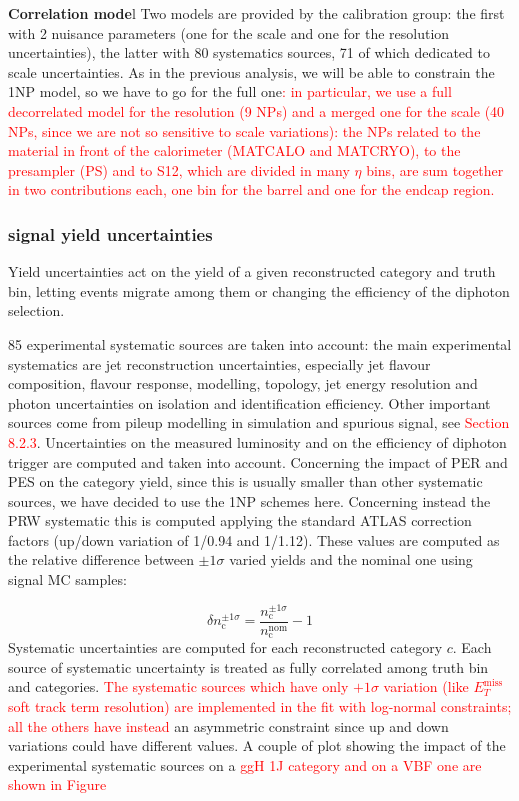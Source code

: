 \textbf{Correlation mode}l Two models are provided by the calibration group: the first with 2 nuisance parameters (one for the scale and one for the resolution uncertainties), the latter with 80 systematics sources, 71 of which dedicated to scale uncertainties. As in the previous analysis, we will be able to constrain the 1NP model, so we have to go for the full one\textcolor{red}{: in particular, we use a full decorrelated model for the resolution (9 NPs) and a merged one for the scale (40 NPs, since we are not so sensitive to scale variations): the NPs related to the material in front of the calorimeter (MATCALO and MATCRYO), to the presampler (PS) and to S12, which are divided in many $\eta$ bins, are sum together in two contributions each, one bin for the barrel and one for the endcap region.}

\subsubsection{signal yield uncertainties}
\label{sssec:yielduncer}

Yield uncertainties act on the yield of a given reconstructed category and truth bin, letting events migrate among them or changing the efficiency of the diphoton selection.

85 experimental systematic sources are taken into account: the main experimental systematics are jet reconstruction uncertainties, especially jet flavour composition, flavour response, modelling, topology, jet energy resolution and photon uncertainties on isolation and identification efficiency. Other important sources come from pileup modelling in simulation and spurious signal, see \textcolor{red}{Section 8.2.3}. Uncertainties on the measured luminosity and on the efficiency of diphoton trigger are computed and taken into account. Concerning the impact of PER and PES on the category yield, since this is usually smaller than other systematic sources, we have decided to use the 1NP schemes here. Concerning instead the PRW systematic this is computed applying the standard ATLAS correction factors (up/down variation of 1/0.94 and 1/1.12). These values are computed as the relative difference between $\pm1\sigma$ varied yields and the nominal one using signal MC samples:

\begin{equation}
\delta n_{\mathrm{c}}^{\pm1\sigma}=\frac{ n_{\mathrm{c}}^{\pm1\sigma}}{n_{\mathrm{c}}^{\mathrm{nom}}}-1
\end{equation}
Systematic uncertainties are computed for each reconstructed category $c$. Each source of systematic uncertainty is treated as fully correlated among truth bin and categories. \textcolor{red}{The systematic sources which have only $+1\sigma$ variation (like $E_{T}^{\mathrm{miss}}$ soft track term resolution) are implemented in the fit with log-normal constraints; all the others have instead} an asymmetric constraint since up and down variations could have different values. A couple of plot showing the impact of the experimental systematic sources on a \textcolor{red}{ggH 1J category and on a VBF one are shown in Figure}


